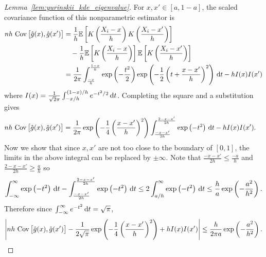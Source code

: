 \begin{proof}[Lemma~\ref{lem:yurinskii_kde_eigenvalue}]

  For $x, x' \in [a, 1-a]$, the scaled covariance function
  of this nonparametric estimator is
  \begin{align*}
    n h\, \operatorname{Cov}\big[\hat g(x), \hat g(x')\big]
    &=
    \frac{1}{h}
    \mathbb{E} \left[
      K \left( \frac{X_i - x}{h} \right)
      K \left( \frac{X_i - x'}{h} \right)
    \right] \\
    &\quad-
    \frac{1}{h}
    \mathbb{E} \left[
      K \left( \frac{X_i - x}{h} \right)
    \right]
    \mathbb{E} \left[
      K \left( \frac{X_i - x'}{h} \right)
    \right] \\
    &=
    \frac{1}{2 \pi}
    \int_{\frac{-x}{h}}^{\frac{1-x}{h}}
    \exp \left( - \frac{t^2}{2} \right)
    \exp \left( - \frac{1}{2} \left( t + \frac{x - x'}{h} \right)^2 \right)
    \,\mathrm{d}t
    - h I(x) I(x')
  \end{align*}
  where
  $I(x) = \frac{1}{\sqrt 2 \pi} \int_{-x/h}^{(1-x)/h} e^{-t^2/2} \,\mathrm{d}t$.
  Completing the square and a substitution gives
  \begin{align*}
    n h\, \operatorname{Cov}\big[\hat g(x), \hat g(x')\big]
    &=
    \frac{1}{2 \pi}
    \exp \left( - \frac{1}{4} \left( \frac{x-x'}{h} \right)^2 \right)
    \int_{\frac{-x-x'}{2h}}^{\frac{2-x-x'}{2h}}
    \exp \left(-t^2\right)
    \,\mathrm{d}t
    - h I(x) I(x').
  \end{align*}
  Now we show that since $x, x'$ are not too close to the boundary
  of $[0,1]$,
  the limits in the above integral can be replaced by $\pm \infty$.
  Note that $\frac{-x-x'}{2h} \leq \frac{-a}{h}$
  and $\frac{2-x-x'}{2h} \geq \frac{a}{h}$ so
  \begin{align*}
    \int_{-\infty}^{\infty}
    \exp \left(-t^2\right)
    \,\mathrm{d}t
    - \int_{\frac{-x-x'}{2h}}^{\frac{2-x-x'}{2h}}
    \exp \left(-t^2\right)
    \,\mathrm{d}t
    \leq
    2 \int_{a/h}^\infty
    \exp \left(-t^2\right)
    \,\mathrm{d}t
    \leq
    \frac{h}{a}
    \exp \left(- \frac{a^2}{h^2}\right).
  \end{align*}
  Therefore since
  $\int_{-\infty}^{\infty} e^{-t^2} \,\mathrm{d}t = \sqrt \pi$,
  \begin{align*}
    \left|
    n h\, \operatorname{Cov}\big[\hat g(x), \hat g(x')\big]
    - \frac{1}{2 \sqrt \pi}
    \exp \left( - \frac{1}{4} \left( \frac{x-x'}{h} \right)^2 \right)
    + h I(x) I(x')
    \right|
    \leq
    \frac{h}{2 \pi a}
    \exp \left(- \frac{a^2}{h^2}\right).
  \end{align*}

\end{proof}
